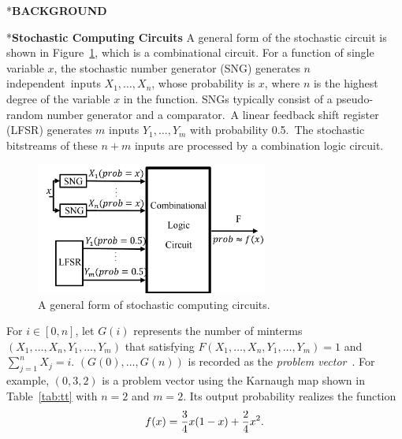 \documentclass[conference,letterpaper]{IEEEtran}
\makeatletter
\renewcommand{\section}{\@startsection{section}{1}{0mm}
    {-\baselineskip}{0.001\baselineskip}{\bf\leftline}}
\renewcommand{\subsection}{\@startsection{subsection}{1}{0mm}
	{-\baselineskip}{0.001\baselineskip}{\bf\leftline}}
\makeatother
\begin{document}
\vspace{2ex}

\section*{\textbf{\large BACKGROUND}}
\subsection*{\textbf{Stochastic Computing Circuits }}
A general form of the stochastic circuit is shown in Figure~\ref{fig2}, which is a combinational circuit. For a function of single variable $x$, the stochastic number generator (SNG) generates $n$ independent inputs $X_{1}, \ldots, X_{n}$, whose probability is $x$, where $n$ is the highest degree of the variable $x$ in the function. SNGs typically consist of a pseudo-random number generator and a comparator. A linear feedback shift register (LFSR) generates $m$ inputs $Y_1, \ldots, Y_m$ with probability 0.5. The stochastic bitstreams of these $n+m$ inputs are processed by a combination logic circuit.

\begin{figure}[t]
	\centering
	\includegraphics[width=3in]{fig/sc.pdf}	
	\caption{\label{fig2}A general form of stochastic computing circuits.} \vspace{-2ex}
\end{figure}

For $i\in[0,n]$, let $G(i)$ represents the number of minterms $(X_{1}, \ldots, X_{n}, Y_{1}, \ldots, Y_{m})$ that satisfying $F(X_{1}, \ldots, X_{n}, Y_{1}, \ldots, Y_{m})=1$ and $\sum_{j=1}^{n} X_{j}=i$. $(G(0), \ldots, G(n))$ is recorded as the \emph{problem vector}~\cite{2}. For example, $(0, 3, 2)$ is a problem vector using the Karnaugh map shown in Table~\ref{tab:tt} with $n=2$ and $m=2$. Its output probability realizes the function
\begin{equation}
f(x)=\frac{3}{4} x(1-x)+\frac{2}{4} x^{2}.\vspace{-2ex}
\end{equation}
\end{document}
